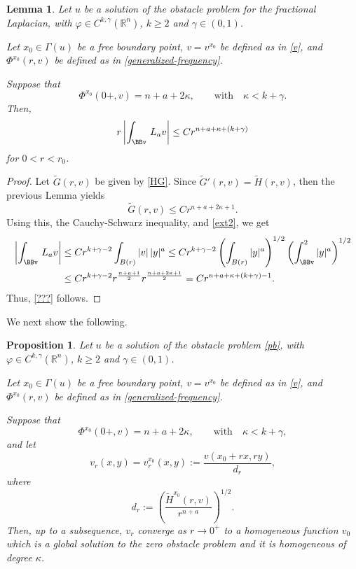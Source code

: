\documentclass[11pt]{amsart}
\theoremstyle{plain}
\newtheorem{lemma}[thrm]{Lemma}
\newtheorem{prop}[thrm]{Proposition}
\numberwithin{equation}{section}
\begin{document}
\begin{lemma}\label{bound-???}
Let $u$ be a solution of the obstacle problem for the fractional Laplacian, with $\varphi\in C^{k,\gamma}({\mathbb R}^n)$,  $k\geq2$ and $\gamma\in(0,1)$.

Let $x_0\in \Gamma(u)$ be a free boundary point, $v=v^{x_0}$ be defined as in \eqref{v}, and $\Phi^{x_0}(r,v)$ be defined as in \eqref{generalized-frequency}.

Suppose that
\[\Phi^{x_0}(0+,v)=n+a+2\kappa,\qquad \textrm{with}\quad \kappa<k+\gamma.\]
Then,
\begin{equation}\label{???}
r\left|\int_\BBv\,L_av\right|\leq Cr^{n+a+\kappa+(k+\gamma)}
\end{equation}
for $0<r<r_0$.
\end{lemma}

\begin{proof}
Let $\tilde{G}(r,v)$ be given by \eqref{HG}.
Since $\tilde{G}'(r,v)=\tilde{H}(r,v)$, then the previous Lemma yields
\[\tilde{G}(r,v)\leq Cr^{n+a+2\kappa+1}.\]
Using this, the Cauchy-Schwarz inequality, and \eqref{ext2}, we get
\[\begin{split}
\left|\int_\BBv\,L_av\right|&\leq C r^{k+\gamma-2}\int_{B(r)}|v|\,|y|^a\leq C r^{k+\gamma-2} \left(\int_{B(r)}|y|^a\right)^{1/2} \left(\int_\BBv^2|y|^a\right)^{1/2}\\
&\leq C r^{k+\gamma-2} r^{\frac{n+a+1}{2}} r^{\frac{n+a+2\kappa+1}{2}}=Cr^{n+a+\kappa+(k+\gamma)-1}.\end{split}\]
Thus, \eqref{???} follows.
\end{proof}

We next show the following.

\begin{prop}\label{blow-ups}
Let $u$ be a solution of the obstacle problem \eqref{pb}, with $\varphi\in C^{k,\gamma}({\mathbb R}^n)$,  $k\geq2$ and $\gamma\in(0,1)$.

Let $x_0\in \Gamma(u)$ be a free boundary point, $v=v^{x_0}$ be defined as in \eqref{v}, and $\Phi^{x_0}(r,v)$ be defined as in \eqref{generalized-frequency}.

Suppose that
\[\Phi^{x_0}(0+,v)=n+a+2\kappa,\qquad \textrm{with}\quad \kappa<k+\gamma,\]
and let
\[v_r(x,y)=v_r^{x_0}(x,y):=\frac{v(x_0+rx,ry)}{d_r},\]
where
\[d_r:=\left(\frac{\tilde H^{x_0}(r,v)}{r^{n+a}}\right)^{1/2}.\]
Then, up to a subsequence, $v_r$ converge as $r\to 0^+$ to a homogeneous function $v_0$ which is a global solution to the zero obstacle problem and it is homogeneous of degree $\kappa$.
\end{prop}
\end{document}
